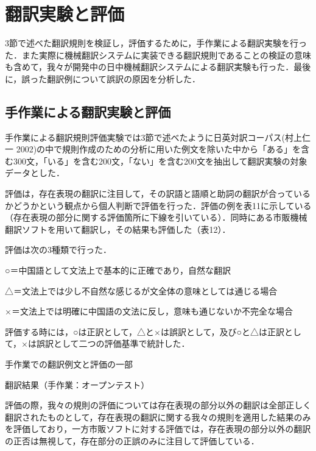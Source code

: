 \documentclass[japanese]{jnlp_1.4}
\begin{document}
\section{翻訳実験と評価}

3節で述べた翻訳規則を検証し，評価するために，手作業による翻訳実験を行った．また実際に機械翻訳システムに実装できる翻訳規則であることの検証の意味も含めて，我々が開発中の日中機械翻訳システムによる翻訳実験も行った．最後に，誤った翻訳例について誤訳の原因を分析した．



\subsection{手作業による翻訳実験と評価}

手作業による翻訳規則評価実験では3節で述べたように日英対訳コーパス(村上仁一 2002)の中で規則作成のための分析に用いた例文を除いた中から「ある」を含む300文，「いる」を含む200文，「ない」を含む200文を抽出して翻訳実験の対象データとした．

評価は，存在表現の翻訳に注目して，その訳語と語順と助詞の翻訳が合っているかどうかという観点から個人判断で評価を行った．評価の例を表11に示している（存在表現の部分に関する評価箇所に下線を引いている）．同時にある市販機械翻訳ソフトを用いて翻訳し，その結果も評価した（表12）．



評価は次の3種類で行った．

○＝中国語として文法上で基本的に正確であり，自然な翻訳

△＝文法上では少し不自然な感じるが文全体の意味としては通じる場合

×＝文法上では明確に中国語の文法に反し，意味も通じないか不完全な場合

評価する時には，○は正訳として，△と×は誤訳として，及び○と△は正訳として，×は誤訳として二つの評価基準で統計した．

\begin{table}[p]
\caption{手作業での翻訳例文と評価の一部}

\par\vspace{2\baselineskip}
\caption{翻訳結果（手作業：オープンテスト）}

\end{table}


評価の際，我々の規則の評価については存在表現の部分以外の翻訳は全部正しく翻訳されたものとして，存在表現の翻訳に関する我々の規則を適用した結果のみを評価しており，一方市販ソフトに対する評価では，存在表現の部分以外の翻訳の正否は無視して，存在部分の正誤のみに注目して評価している．
\end{document}
